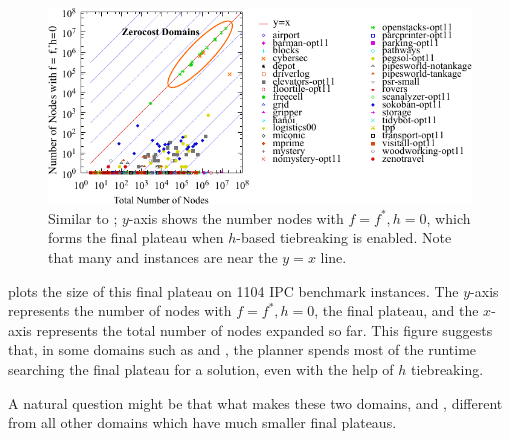 \begin{figure}[htbp]
   \centering
  \includegraphics{tables/aaai16-frontier/aaai16prelim3/lmcut_frontier-front.pdf}
  \caption{
  Similar to ; $y$-axis shows
  the number nodes with $f=f^*, h=0$, which forms the final
  plateau when $h$-based tiebreaking is enabled.
  Note that many  and  instances are near the $y=x$ line.
  }
  \label{fig:plateau}
\end{figure}

 plots the size of this final plateau on 1104 IPC
benchmark instances.  The $y$-axis represents the number of nodes with
$f=f^*, h=0$, the final plateau, and the $x$-axis represents the total
number of nodes expanded so far. This figure suggests that, in some
domains such as  and , the planner
spends most of the runtime searching the final plateau for a solution,
even with the help of $h$ tiebreaking.

A natural question might be that what makes these two domains,
 and , different from all other domains
which have much smaller final plateaus.

